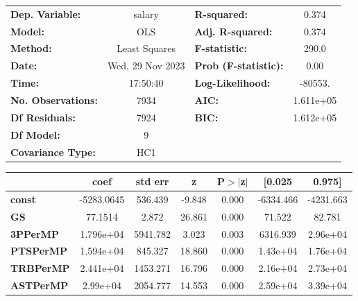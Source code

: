 \begin{center}
\begin{tabular}{lclc}
\toprule
\textbf{Dep. Variable:}    &      salary      & \textbf{  R-squared:         } &     0.374   \\
\textbf{Model:}            &       OLS        & \textbf{  Adj. R-squared:    } &     0.374   \\
\textbf{Method:}           &  Least Squares   & \textbf{  F-statistic:       } &     290.0   \\
\textbf{Date:}             & Wed, 29 Nov 2023 & \textbf{  Prob (F-statistic):} &     0.00    \\
\textbf{Time:}             &     17:50:40     & \textbf{  Log-Likelihood:    } &   -80553.   \\
\textbf{No. Observations:} &        7934      & \textbf{  AIC:               } & 1.611e+05   \\
\textbf{Df Residuals:}     &        7924      & \textbf{  BIC:               } & 1.612e+05   \\
\textbf{Df Model:}         &           9      & \textbf{                     } &             \\
\textbf{Covariance Type:}  &       HC1        & \textbf{                     } &             \\
\bottomrule
\end{tabular}
\begin{tabular}{lcccccc}
                       & \textbf{coef} & \textbf{std err} & \textbf{z} & \textbf{P$> |$z$|$} & \textbf{[0.025} & \textbf{0.975]}  \\
\midrule
\textbf{const}         &   -5283.0645  &      536.439     &    -9.848  &         0.000        &    -6334.466    &    -4231.663     \\
\textbf{GS}            &      77.1514  &        2.872     &    26.861  &         0.000        &       71.522    &       82.781     \\
\textbf{3PPerMP}       &    1.796e+04  &     5941.782     &     3.023  &         0.003        &     6316.939    &     2.96e+04     \\
\textbf{PTSPerMP}      &    1.594e+04  &      845.327     &    18.860  &         0.000        &     1.43e+04    &     1.76e+04     \\
\textbf{TRBPerMP}      &    2.441e+04  &     1453.271     &    16.796  &         0.000        &     2.16e+04    &     2.73e+04     \\
\textbf{ASTPerMP}      &     2.99e+04  &     2054.777     &    14.553  &         0.000        &     2.59e+04    &     3.39e+04     \\

\end{tabular}
\end{center}
